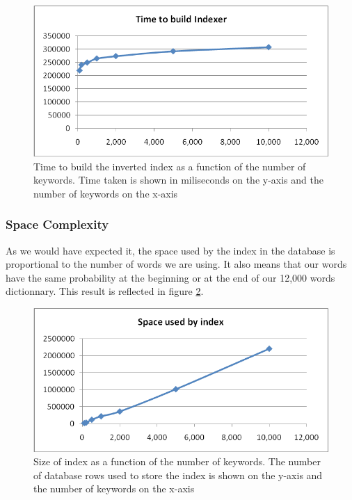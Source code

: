 \documentclass[10pt]{report}
\begin{document}
\begin{itemize}
  \begin{figure}
    \begin{center}
      \includegraphics[width=\textwidth,height=!]{numkeywordstimecomplexbuildindex}
    \end{center}
    \caption{Time to build the inverted index as a function of the
      number of keywords. Time taken is shown in miliseconds on the
      y-axis and the number of keywords on the x-axis}
    \label{fig:numkeywordstimecomplexbuildindex}
  \end{figure} 

\end{itemize}


\subsubsection{Space Complexity}
As we would have expected it, the space used by the index in the
database is proportional to the number of words we are using. It also
means that our words have the same probability at the beginning or at
the end of our 12,000 words dictionnary. This result is reflected in
figure \ref{fig:numkeywordsspacecomplexbuildindex}.

\begin{figure}
  \begin{center}
    \includegraphics[width=\textwidth,height=!]{numkeywordsspacecomplexbuildindex}
  \end{center}
    \caption{Size of index as a function of the number of
      keywords. The number of database rows used to store the index is
      shown on the y-axis and the number of keywords on the x-axis} 
    \label{fig:numkeywordsspacecomplexbuildindex}
\end{figure} 
\end{document}
